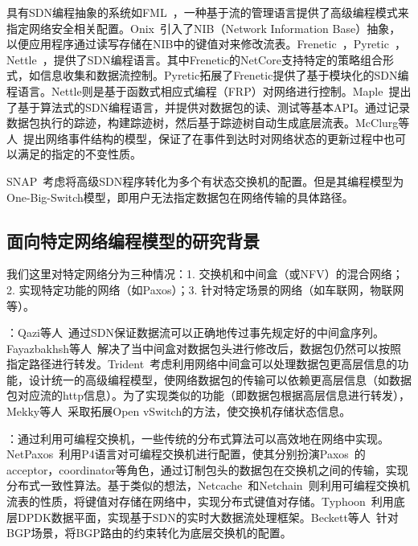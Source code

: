 具有SDN编程抽象的系统如FML~\cite{hinrichs2009practical}，一种基于流的管理语言提供了高级编程模式来指定网络安全相关配置。Onix~\cite{koponen2010onix}引入了NIB（Network Information Base）抽象，以便应用程序通过读写存储在NIB中的键值对来修改流表。Frenetic~\cite{foster2011frenetic}，Pyretic~\cite{reich2013modular}，Nettle~\cite{voellmy2011nettle}，提供了SDN编程语言。其中Frenetic的NetCore支持特定的策略组合形式，如信息收集和数据流控制。Pyretic拓展了Frenetic提供了基于模块化的SDN编程语言。Nettle则是基于函数式相应式编程（FRP）对网络进行控制。Maple~\cite{maple}提出了基于算法式的SDN编程语言，并提供对数据包的读、测试等基本API。通过记录数据包执行的踪迹，构建踪迹树，然后基于踪迹树自动生成底层流表。McClurg等人~\cite{mcclurg2016event}提出网络事件结构的模型，保证了在事件到达时对网络状态的更新过程中也可以满足的指定的不变性质。

SNAP~\cite{snap}考虑将高级SDN程序转化为多个有状态交换机的配置。但是其编程模型为One-Big-Switch模型，即用户无法指定数据包在网络传输的具体路径。


\subsection{面向特定网络编程模型的研究背景}

我们这里对特定网络分为三种情况：1. 交换机和中间盒（或NFV）的混合网络；2. 实现特定功能的网络（如Paxos）；3. 针对特定场景的网络（如车联网，物联网等）。

：Qazi等人~\cite{qazi2013simple}通过SDN保证数据流可以正确地传过事先规定好的中间盒序列。Fayazbakhsh等人~\cite{fayazbakhsh2014enforcing}解决了当中间盒对数据包头进行修改后，数据包仍然可以按照指定路径进行转发。Trident~\cite{gao2018t}考虑利用网络中间盒可以处理数据包更高层信息的功能，设计统一的高级编程模型，使网络数据包的传输可以依赖更高层信息（如数据包对应流的http信息）。为了实现类似的功能（即数据包根据高层信息进行转发），Mekky等人~\cite{mekky2014application}采取拓展Open vSwitch的方法，使交换机存储状态信息。

：通过利用可编程交换机，一些传统的分布式算法可以高效地在网络中实现。NetPaxos~\cite{dang2015netpaxos,dang2016paxos}利用P4语言对可编程交换机进行配置，使其分别扮演Paxos~\cite{lamport2001paxos}的acceptor，coordinator等角色，通过订制包头的数据包在交换机之间的传输，实现分布式一致性算法。基于类似的想法，Netcache~\cite{jin2017netcache}和Netchain~\cite{jin2018netchain}则利用可编程交换机流表的性质，将键值对存储在网络中，实现分布式键值对存储。Typhoon~\cite{cho2017typhoon}利用底层DPDK数据平面，实现基于SDN的实时大数据流处理框架。Beckett等人~\cite{beckett2016don}针对BGP场景，将BGP路由的约束转化为底层交换机的配置。

